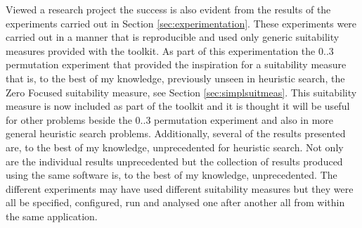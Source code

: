 Viewed a research project the success is also evident from the results of the experiments carried out in Section \ref{sec:experimentation}.
These experiments were carried out in a manner that is reproducible and used only generic suitability measures provided with the toolkit.
As part of this experimentation the $0..3$ permutation experiment that provided the inspiration for a suitability measure that is, to the best of my knowledge,  previously unseen in heuristic search, the Zero Focused suitability measure, see Section \ref{sec:simplsuitmeas}.
This suitability measure is now included as part of the toolkit and it is thought it will be useful for other problems beside the $0..3$ permutation experiment and also in more general heuristic search problems.
Additionally, several of the results presented are, to the best of my knowledge, unprecedented for heuristic search.
Not only are the individual results unprecedented but the collection of results produced using the same software is, to the best of my knowledge, unprecedented.
The different experiments may have used different suitability measures but they were all be specified, configured, run and analysed one after another all from within the same application.

